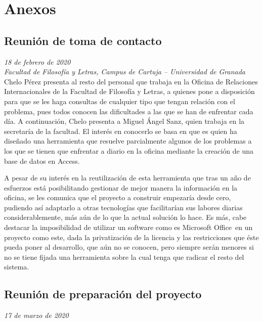 \chapter*{Anexos}
\begin{appendices}
	\section*{Reunión de toma de contacto}
	\label{reunion1}
		\textit{18 de febrero de 2020}\\

		\textit{Facultad de Filosofía y Letras, Campus de Cartuja -- Universidad de Granada}\\
		
		Chelo Pérez presenta al resto del personal que trabaja en la Oficina de Relaciones Internacionales de la Facultad de Filosofía y Letras, a quienes pone a disposición para que se les haga consultas de cualquier tipo que tengan relación con el problema, pues todos conocen las dificultades a las que se han de enfrentar cada día. A continuación, Chelo presenta a Miguel Ángel Sanz, quien trabaja en la secretaría de la facultad. El interés en conocerlo se basa en que es quien ha diseñado una herramienta que resuelve parcialmente algunos de los problemas a los que se tienen que enfrentar a diario en la oficina mediante la creación de una base de datos en Access\textregistered.
		
		A pesar de su interés en la reutilización de esta herramienta que tras un año de esfuerzos está posibilitando gestionar de mejor manera la información en la oficina, se les comunica que el proyecto a construir empezaría desde cero, pudiendo así adaptarlo a otras tecnologías que facilitarían sus labores diarias considerablemente, más aún de lo que la actual solución lo hace. Es más, cabe destacar la imposibilidad de utilizar un software como es Microsoft Office\textregistered \ en un proyecto como este, dada la privatización de la licencia y las restricciones que éste pueda poner al desarrollo, que aún no se conocen, pero siempre serán menores si no se tiene fijada una herramienta sobre la cual tenga que radicar el resto del sistema.
		
	\section*{Reunión de preparación del proyecto}
	\label{reunion2}
	
	\textit{17 de marzo de 2020}\\
	

\end{appendices}
